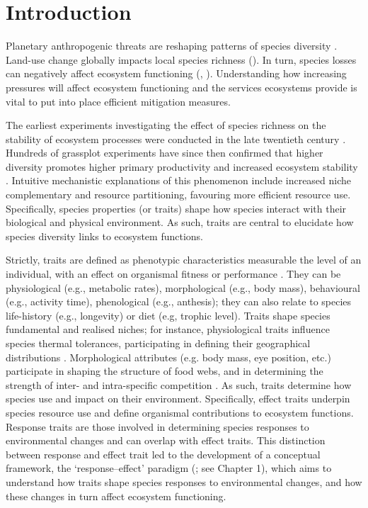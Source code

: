 \section{Introduction}
Planetary anthropogenic threats are reshaping patterns of species diversity \citep{ Spooner2018, Bohm2013, Schipper2008, Stuart2004}. Land-use change globally impacts local species richness (\cite{Newbold2015}). In turn, species losses can negatively affect ecosystem functioning (\cite{Hooper2005}, \cite{Hooper2012}). Understanding how increasing pressures will affect ecosystem functioning and the services ecosystems provide is vital to put into place efficient mitigation measures.
   
The earliest experiments investigating the effect of species richness on the stability of ecosystem processes were conducted in the late twentieth century \citep{Tilman1994, Naeem1994}. Hundreds of grassplot experiments have since then confirmed that higher diversity promotes higher primary productivity and increased ecosystem stability \citep{Tilman2014, Balvanera2006}. Intuitive mechanistic explanations of this phenomenon include increased niche complementary and resource partitioning, favouring more efficient resource use. Specifically, species properties (or traits) shape how species interact with their biological and physical environment. As such, traits are central to elucidate how species diversity links to ecosystem functions. 

Strictly, traits are defined as phenotypic characteristics measurable the level of an individual, with an effect on organismal fitness or performance \citep{McGill2006, Violle2007}. They can be physiological (e.g., metabolic rates), morphological (e.g., body mass), behavioural (e.g., activity time), phenological (e.g., anthesis); they can also relate to species life-history (e.g., longevity) or diet (e.g, trophic level).
Traits shape species fundamental and realised niches; for instance, physiological traits influence species thermal tolerances, participating in defining their geographical distributions \citep{Calosi2010, Khaliq2017}. Morphological attributes (e.g. body mass, eye position, etc.) participate in shaping the structure of food webs, and in determining the strength of inter- and intra-specific competition \citep{Gravel2016, Laigle2018}. As such, traits determine how species use and impact on their environment. Specifically, effect traits underpin species resource use and define organismal contributions to ecosystem functions. Response traits are those involved in determining species responses to environmental changes and can overlap with effect traits. This distinction between response and effect trait led to the development of a conceptual framework, the `response--effect' paradigm (\cite{Lavorel2002,Luck2012}; see Chapter 1), which aims to understand how traits shape species responses to environmental changes, and how these changes in turn affect ecosystem functioning. 

